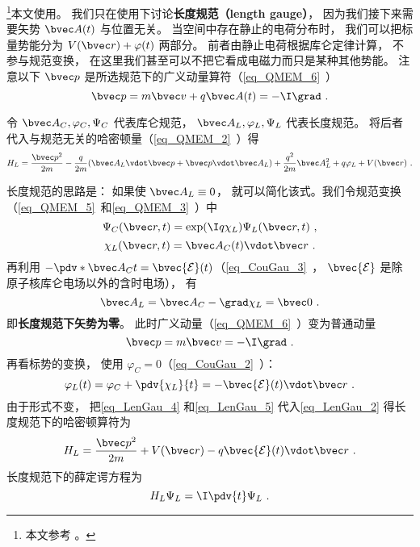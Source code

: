 

\footnote{本文参考 \cite{Bransden}。}本文使用。 我们只在使用下讨论\textbf{长度规范（length gauge）}， 因为我们接下来需要矢势 $\bvec A(t)$ 与位置无关。 当空间中存在静止的电荷分布时， 我们可以把标量势能分为 $V(\bvec r) + \varphi(t)$ 两部分。 前者由静止电荷根据库仑定律计算， 不参与规范变换， 在这里我们甚至可以不把它看成电磁力而只是某种其他势能。
注意以下 $\bvec p$ 是所选规范下的广义动量算符（\autoref{eq_QMEM_6}~）
\begin{equation}
\bvec p = m \bvec v + q\bvec A(t) = -\I \grad~.
\end{equation}

令 $\bvec A_C, \varphi_C, \Psi_C$ 代表库仑规范， $\bvec A_L, \varphi_L, \Psi_L$ 代表长度规范。 将后者代入与规范无关的哈密顿量（\autoref{eq_QMEM_2}~）得
\begin{equation}\label{eq_LenGau_2}
H_L = \frac{\bvec p^2}{2m} - \frac{q}{2m} (\bvec A_L \vdot \bvec p + \bvec p \vdot \bvec A_L) + \frac{q^2}{2m} \bvec A_L^2 + q \varphi_L + V(\bvec r)~.
\end{equation}


长度规范的思路是： 如果使 $\bvec A_L \equiv 0$， 就可以简化该式。我们令规范变换（\autoref{eq_QMEM_5}~和\autoref{eq_QMEM_3}~）中
\begin{equation}\label{eq_LenGau_1}
\Psi_C(\bvec r, t) = \exp(\I q\chi_L)\Psi_L(\bvec r, t)~,
\end{equation}
\begin{equation}
\chi_L(\bvec r, t) = \bvec A_C(t) \vdot \bvec r~.
\end{equation}
再利用 $-\pdv*{\bvec A_C}{t} = \bvec {\mathcal E}(t)$（\autoref{eq_CouGau_3}~， $\bvec {\mathcal E}$ 是除原子核库仑电场以外的含时电场）， 有
\begin{equation}\label{eq_LenGau_4}
\bvec A_L = \bvec A_C - \grad \chi_L = \bvec 0~.
\end{equation}
即\textbf{长度规范下矢势为零}。 此时广义动量（\autoref{eq_QMEM_6}~）变为普通动量
\begin{equation}\label{eq_LenGau_6}
\bvec p = m \bvec v = -\I \grad~.
\end{equation}
再看标势的变换， 使用 $\varphi_C = 0$（\autoref{eq_CouGau_2}~）：
\begin{equation}\label{eq_LenGau_5}
\varphi_L(t) = \varphi_C + \pdv{\chi_L}{t} = -\bvec {\mathcal E}(t) \vdot \bvec r~.
\end{equation}
由于形式不变， 把\autoref{eq_LenGau_4} 和\autoref{eq_LenGau_5} 代入\autoref{eq_LenGau_2} 得长度规范下的哈密顿算符为
\begin{equation}\label{eq_LenGau_7}
H_L = \frac{\bvec p^2}{2m} + V(\bvec r) - q\bvec{\mathcal{E}}(t) \vdot \bvec r~.
\end{equation}
长度规范下的薛定谔方程为
\begin{equation}\label{eq_LenGau_3}
H_L \Psi_L = \I \pdv{t} \Psi_L~.
\end{equation}
